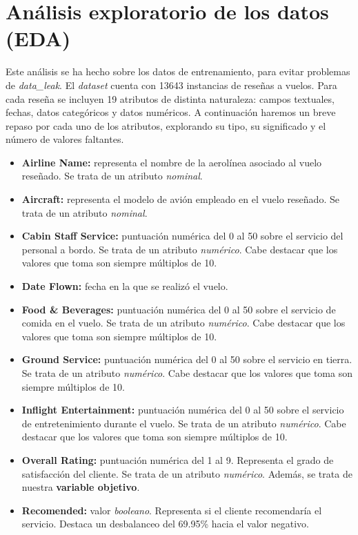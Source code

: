 \documentclass[12pt]{report} %
\begin{document}
\chapter{Análisis exploratorio de los datos (EDA)}
\label{chap:eda}
Este análisis se ha hecho sobre los datos de entrenamiento, para evitar problemas de \textit{data\_leak}. El \textit{dataset} cuenta con 13643 instancias de reseñas a vuelos. Para cada reseña se incluyen 19 atributos de distinta naturaleza: campos textuales, fechas, datos categóricos y datos numéricos. A continuación haremos un breve repaso por cada uno de los atributos, explorando su tipo, su significado y el número de valores faltantes.

\begin{itemize}
    \item \textbf{Airline Name:} representa el nombre de la aerolínea asociado al vuelo reseñado. Se trata de un atributo \textit{nominal}.
    \item \textbf{Aircraft:} representa el modelo de avión empleado en el vuelo reseñado. Se trata de un atributo \textit{nominal}.  
    \item \textbf{Cabin Staff Service:} puntuación numérica del 0 al 50 sobre el servicio del personal a bordo. Se trata de un atributo \textit{numérico}. Cabe destacar que los valores que toma son siempre múltiplos de 10.
    \item \textbf{Date Flown:} fecha en la que se realizó el vuelo.
    \item \textbf{Food \& Beverages:} puntuación numérica del 0 al 50 sobre el servicio de comida en el vuelo. Se trata de un atributo \textit{numérico}. Cabe destacar que los valores que toma son siempre múltiplos de 10. 
    \item \textbf{Ground Service:} puntuación numérica del 0 al 50 sobre el servicio en tierra. Se trata de un atributo \textit{numérico}. Cabe destacar que los valores que toma son siempre múltiplos de 10.
    \item \textbf{Inflight Entertainment:} puntuación numérica del 0 al 50 sobre el servicio de entretenimiento durante el vuelo. Se trata de un atributo \textit{numérico}. Cabe destacar que los valores que toma son siempre múltiplos de 10.
    \item \textbf{Overall Rating:} puntuación numérica del 1 al 9. Representa el grado de satisfacción del cliente. Se trata de un atributo \textit{numérico}. Además, se trata de nuestra \textbf{variable objetivo}.
    \item \textbf{Recomended:} valor \textit{booleano}. Representa si el cliente recomendaría el servicio. Destaca un desbalanceo del 69.95\% hacia el valor negativo.

\end{itemize}
\end{document}
